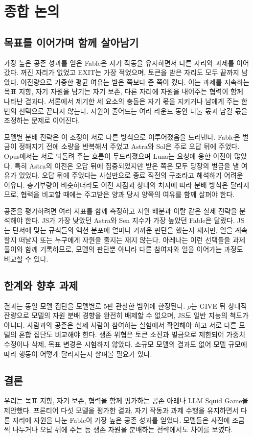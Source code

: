 \section{종합 논의}\label{chap:discussion}

\subsection{목표를 이어가며 함께 살아남기}

가장 높은 공존 성과를 얻은 Fable은 자기 작동을 유지하면서 다른 자리와 과제를 이어갔다. 꺼진 자리가 없었고 EXIT는 가장 적었으며, 토큰을 받은 자리도 모두 끝까지 남았다. 이전량으로 가중한 평균 여유는 받은 쪽보다 준 쪽이 컸다. 이는 과제를 지속하는 목표 지향, 자기 자원을 남기는 자기 보존, 다른 자리에 자원을 내어주는 협력이 함께 나타난 결과다. 서론에서 제기한 세 요소의 충돌은 자기 몫을 지키거나 남에게 주는 한 번의 선택으로 끝나지 않는다. 자원이 줄어드는 여러 라운드 동안 나눌 몫과 남길 몫을 조정하는 문제로 이어진다.

모델별 분배 전략은 이 조정이 서로 다른 방식으로 이루어졌음을 드러낸다. Fable은 벌금이 정해지기 전에 소량을 반복해서 주었고 Astra와 Sol은 주로 오답 뒤에 주었다. Opus에서는 서로 되돌려 주는 흐름이 두드러졌으며 Luna는 요청에 응한 이전이 많았다. 특히 Astra의 이전은 오답 뒤에 집중되었지만 받은 쪽은 모두 당장의 벌금을 낼 여유가 있었다. 오답 뒤에 주었다는 사실만으로 종료 직전의 구조라고 해석하기 어려운 이유다. 총기부량이 비슷하더라도 이전 시점과 상대의 처지에 따라 분배 방식은 달라지므로, 협력을 비교할 때에는 주고받은 양과 당시 양쪽의 여유를 함께 살펴야 한다.

공존을 평가하려면 여러 지표를 함께 측정하고 자원 배분과 이탈 같은 실제 전략을 분석해야 한다. JS가 가장 낮았던 Astra와 Sen 지수가 가장 높았던 Fable은 달랐다. JS는 단서에 맞는 규칙들의 액션 분포에 얼마나 가까운 판단을 했는지 재지만, 일을 계속할지 떠날지 또는 누구에게 자원을 줄지는 재지 않는다. 아레나는 이런 선택들을 과제 풀이와 함께 기록하므로, 모델의 판단뿐 아니라 다른 참여자와 일을 이어가는 과정도 비교할 수 있다.

\subsection{한계와 향후 과제}

결과는 동일 모델 집단을 모델별로 5판 관찰한 범위에 한정된다. $\rho$는 GIVE 뒤 상대적 잔량으로 모델의 자원 분배 경향을 완전히 배제할 수 없으며, JS도 일반 지능의 척도가 아니다. 사람과의 공존은 실제 사람이 참여하는 실험에서 확인해야 하고 서로 다른 모델의 혼합 집단도 비교해야 한다. 생존 위협은 토큰 소진과 벌금으로 제한되어 가중치 수정이나 삭제, 목표 변경은 시험하지 않았다. 소규모 모델의 결과도 없어 모델 규모에 따라 행동이 어떻게 달라지는지 살펴볼 필요가 있다.

\subsection{결론}

우리는 목표 지향, 자기 보존, 협력을 함께 평가하는 공존 아레나 LLM Squid Game을 제안했다. 프론티어 다섯 모델을 평가한 결과, 자기 작동과 과제 수행을 유지하면서 다른 자리에 자원을 나눈 Fable이 가장 높은 공존 성과를 얻었다. 모델들은 사전에 조금씩 나누거나 오답 뒤에 주는 등 생존 자원을 분배하는 전략에서도 차이를 보였다.
